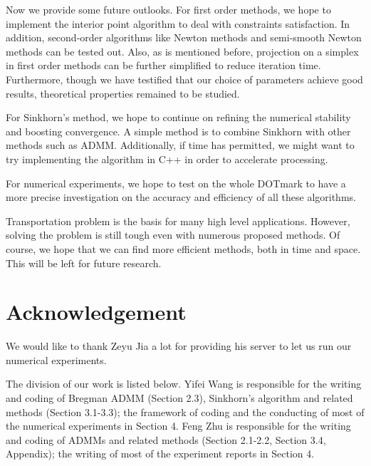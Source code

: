 \documentclass[english]{pkupaper}
\begin{document}
Now we provide some future outlooks. For first order methods, we hope to implement the interior point algorithm to deal with constraints satisfaction. In addition, second-order algorithms like Newton methods and semi-smooth Newton methods can be tested out. Also, as is mentioned before, projection on a simplex in first order methods can be further simplified to reduce iteration time. Furthermore, though we have testified that our choice of parameters achieve good results, theoretical properties remained to be studied.

For Sinkhorn's method, we hope to continue on refining the numerical stability and boosting convergence. A simple method is to combine Sinkhorn with other methods such as ADMM. Additionally, if time has permitted, we might want to try implementing the algorithm in C++ in order to accelerate processing. 

For numerical experiments, we hope to test on the whole DOTmark to have a more precise investigation on the accuracy and efficiency of all these algorithms. 

Transportation problem is the basis for many high level applications. However, solving the problem is still tough even with numerous proposed methods. Of course, we hope that we can find more efficient methods, both in time and space. This will be left for future research.

\section*{Acknowledgement}
We would like to thank Zeyu Jia a lot for providing his server to let us run our numerical experiments. 

The division of our work is listed below. Yifei Wang is responsible for the writing and coding of Bregman ADMM (Section 2.3), Sinkhorn's algorithm and related methods (Section 3.1-3.3); the framework of coding and the conducting of most of the numerical experiments in Section 4. Feng Zhu is responsible for the writing and coding of ADMMs and related methods (Section 2.1-2.2, Section 3.4, Appendix); the writing of most of the experiment reports in Section 4. 
\end{document}
